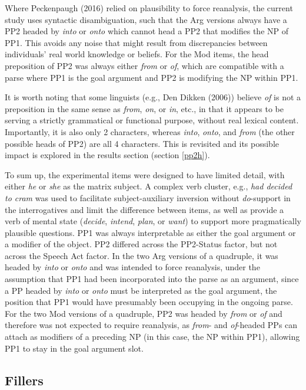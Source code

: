\documentclass[12pt,oneside]{book}
\begin{document}
Where Peckenpaugh (2016) relied on plausibility to force reanalysis, the current study uses syntactic disambiguation, such that the Arg versions always have a PP2 headed by \emph{into} or \emph{onto} which cannot head a PP2 that modifies the NP of PP1. This avoids any noise that might result from discrepancies between individuals' real world knowledge or beliefs. For the Mod items, the head preposition of PP2 was always either \emph{from} or \emph{of}, which are compatible with a parse where PP1 is the goal argument and PP2 is modifying the NP within PP1.

It is worth noting that some linguists (e.g., Den Dikken (2006)) believe \emph{of} is not a preposition in the same sense as \emph{from}, \emph{on}, or \emph{in}, etc., in that it appears to be serving a strictly grammatical or functional purpose, without real lexical content. Importantly, it is also only 2 characters, whereas \emph{into}, \emph{onto}, and \emph{from} (the other possible heads of PP2) are all 4 characters. This is revisited and its possible impact is explored in the results section (section \ref{pp2h}).

To sum up, the experimental items were designed to have limited detail, with either \emph{he} or \emph{she} as the matrix subject. A complex verb cluster, e.g., \emph{had decided to cram} was used to facilitate subject-auxiliary inversion without \emph{do}-support in the interrogatives and limit the difference between items, as well as provide a verb of mental state (\emph{decide}, \emph{intend}, \emph{plan}, or \emph{want}) to support more pragmatically plausible questions. PP1 was always interpretable as either the goal argument or a modifier of the object. PP2 differed across the PP2-Status factor, but not across the Speech Act factor. In the two Arg versions of a quadruple, it was headed by \emph{into} or \emph{onto} and was intended to force reanalysis, under the assumption that PP1 had been incorporated into the parse as an argument, since a PP headed by \emph{into} or \emph{onto} must be interpreted as the goal argument, the position that PP1 would have presumably been occupying in the ongoing parse. For the two Mod versions of a quadruple, PP2 was headed by \emph{from} or \emph{of} and therefore was not expected to require reanalysis, as \emph{from}- and \emph{of}-headed PPs can attach as modifiers of a preceding NP (in this case, the NP within PP1), allowing PP1 to stay in the goal argument slot.

\hypertarget{fillers}{%
\subsection{Fillers}\label{fillers}}
\end{document}
